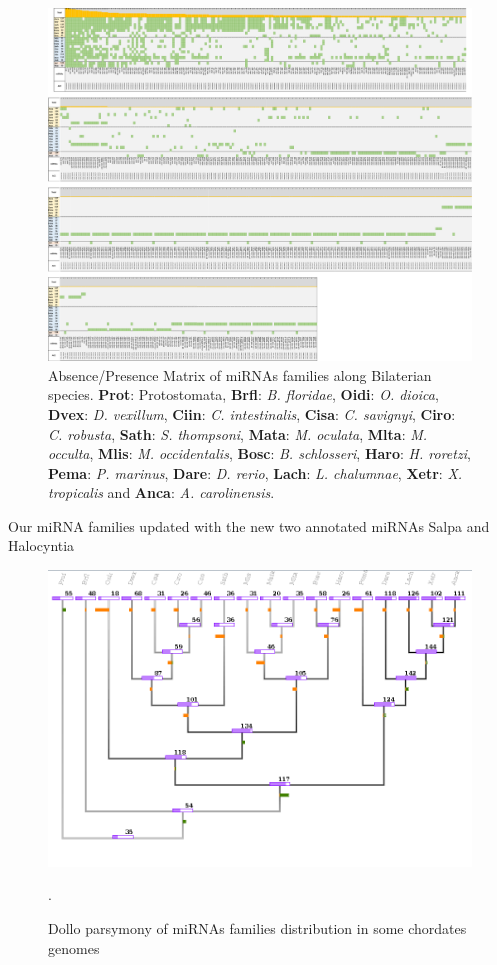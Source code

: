 \documentclass[graybox]{svmult}
\begin{document}
\begin{figure}[ht!]
\centering 
\includegraphics[width=\textwidth, angle=90]{./Images/miRNA_matrix}
\caption{Absence/Presence Matrix of miRNAs families along Bilaterian species. 
\textbf{Prot}: Protostomata, \textbf{Brfl}: \textit{B. floridae}, 
\textbf{Oidi}: \textit{O. dioica}, \textbf{Dvex}: \textit{D. vexillum}, 
\textbf{Ciin}: \textit{C. intestinalis}, \textbf{Cisa}: \textit{C. savignyi}, 
\textbf{Ciro}: \textit{C. robusta}, \textbf{Sath}: \textit{S. thompsoni}, 
\textbf{Mata}: \textit{M. oculata}, \textbf{Mlta}: \textit{M. occulta}, 
\textbf{Mlis}: \textit{M. occidentalis}, \textbf{Bosc}: \textit{B. schlosseri}, 
\textbf{Haro}: \textit{H. roretzi}, \textbf{Pema}: \textit{P. marinus}, 
\textbf{Dare}: \textit{D. rerio}, \textbf{Lach}: \textit{L. chalumnae}, 
\textbf{Xetr}: \textit{X. tropicalis} and \textbf{Anca}: \textit{A. 
carolinensis}. }
\label{fig:matrimirnas}
\end{figure}

Our miRNA families updated with the new two annotated miRNAs Salpa and 
Halocyntia

\begin{figure}[ht!]
\centering
\includegraphics[width=\textwidth]{./Images/finalTree.png}
\caption{Dollo parsymony of miRNAs families distribution in some 
chordates genomes}.
\label{fig:dollotree}
\end{figure}
\end{document}
